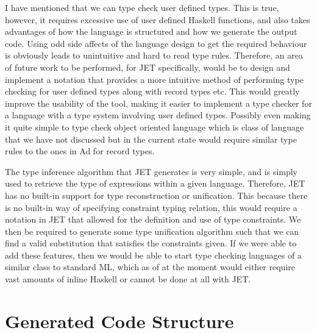 I have mentioned that we can type check user defined types.
This is true, however, it requires excessive use of user defined Haskell functions, and also takes advantages of how the language is structured and how we generate the output code.
Using odd side affects of the language design to get the required behaviour is obviously leads to unintuitive and hard to read type rules.
Therefore, an area of future work to be performed, for JET specifically, would be to design and implement a notation that provides a more intuitive method of performing type checking for user defined types along with record types etc.
This would greatly improve the usability of the tool, making it easier to implement a type checker for a language with a type system involving user defined types.
Possibly even making it quite simple to type check object oriented language which is class of language that we have not discussed but in the current state would require similar type rules to the ones in Ad for record types.

The type inference algorithm that JET generates is very simple, and is simply used to retrieve the type of expressions within a given language.
Therefore, JET has no built-in support for type reconstruction or unification\cite{pierce2002types,cardelli1996type}.
This because there is no built-in way of specifying constraint typing relation\cite{pierce2002types}, this would require a notation in JET that allowed for the definition and use of type constraints.
We then be required to generate some type unification algorithm such that we can find a valid substitution that satisfies the constraints given. 
If we were able to add these features, then we would be able to start type checking languages of a similar class to standard ML\cite{milner1997definition}, which as of at the moment would either require vast amounts of inline Haskell or cannot be done at all with JET.

\section{Generated Code Structure}


